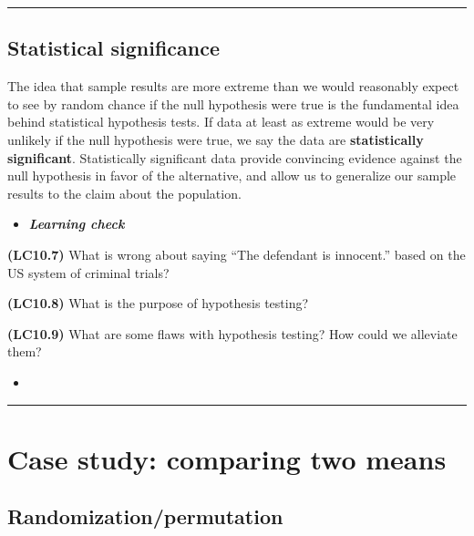 \documentclass[12pt, krantz2,]{krantz}
\newenvironment{rmdblock}[1]
  {\begin{shaded*}
  \begin{itemize}
  \renewcommand{\labelitemi}{
    \raisebox{-.7\height}[0pt][0pt]{
    }
  }
  \item
  }
  {
  \end{itemize}
  \end{shaded*}
  }
\newenvironment{learncheck}
  {\begin{rmdblock}{warning}}
  {\end{rmdblock}}
\begin{document}
\begin{center}\rule{0.5\linewidth}{\linethickness}\end{center}

\hypertarget{statistical-significance}{%
\subsection{Statistical significance}\label{statistical-significance}}

The idea that sample results are more extreme than we would reasonably expect to see by random chance if the null hypothesis were true is the fundamental idea behind statistical hypothesis tests. If data at least as extreme would be very unlikely if the null hypothesis were true, we say the data are \textbf{statistically significant}. Statistically significant data provide convincing evidence against the null hypothesis in favor of the alternative, and allow us to generalize our sample results to the claim about the population.

\begin{learncheck}
\textbf{\emph{Learning check}}
\end{learncheck}

\textbf{(LC10.7)} What is wrong about saying ``The defendant is innocent.'' based on the US system of criminal trials?

\textbf{(LC10.8)} What is the purpose of hypothesis testing?

\textbf{(LC10.9)} What are some flaws with hypothesis testing? How could we alleviate them?

\begin{learncheck}

\end{learncheck}

\begin{center}\rule{0.5\linewidth}{\linethickness}\end{center}

\hypertarget{ht-case-study}{%
\section{Case study: comparing two means}\label{ht-case-study}}

\hypertarget{randomizationpermutation}{%
\subsection{Randomization/permutation}\label{randomizationpermutation}}
\end{document}

